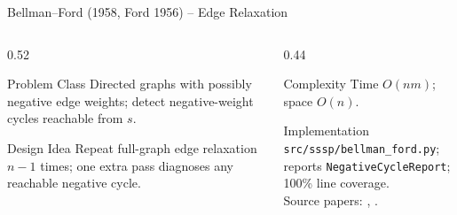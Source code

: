 \documentclass[aspectratio=169]{beamer}
\begin{document}
\begin{frame}{Bellman--Ford (1958, Ford 1956) -- Edge Relaxation}
  \begin{columns}[T]
    \begin{column}{0.52\textwidth}
      \begin{block}{Problem Class}
        Directed graphs with possibly negative edge weights; detect negative-weight cycles reachable from $s$.
      \end{block}
      \begin{block}{Design Idea}
        Repeat full-graph edge relaxation $n-1$ times; one extra pass diagnoses any reachable negative cycle.
      \end{block}
    \end{column}
    \begin{column}{0.44\textwidth}
      \begin{exampleblock}{Complexity}
        Time $O(n m)$; space $O(n)$.
      \end{exampleblock}
      \begin{alertblock}{Implementation}
        \texttt{src/sssp/bellman\_ford.py}; reports \texttt{NegativeCycleReport};\\100\% line coverage.
        \\Source papers: \cite{bellman1958routing}, \cite{ford1956network}.
      \end{alertblock}
    \end{column}
  \end{columns}
\end{frame}
\end{document}
